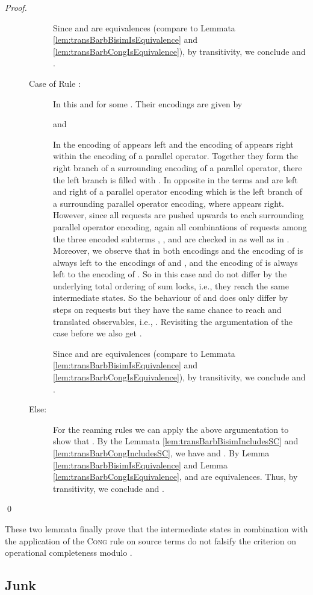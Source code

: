 \documentclass[]{llncs}
\begin{document}
\begin{proof}
\begin{description}
\begin{description}
				Since  and  are equivalences (compare to Lemmata \ref{lem:transBarbBisimIsEquivalence} and \ref{lem:transBarbCongIsEquivalence}), by transitivity, we conclude  and .
			\item[Case of Rule :] In this  and  for some . Their encodings are given by
				
				and
				
				In  the encoding of  appears left and the encoding of  appears right within the encoding of a parallel operator. Together they form the right branch of a surrounding encoding of a parallel operator, there the left branch is filled with . In opposite in  the terms  and  are left and right of a parallel operator encoding which is the left branch of a surrounding parallel operator encoding, where  appears right. However, since all requests are pushed upwards to each surrounding parallel operator encoding, again all combinations of requests among the three encoded subterms , , and  are checked in  as well as in . Moreover, we observe that in both encodings  and  the encoding of  is always left to the encodings of  and , and the encoding of  is always left to the encoding of . So in this case  and  do not differ by the underlying total ordering of sum locks, i.e., they reach the same intermediate states. So the behaviour of  and  does only differ by \pure \admin steps on requests but they have the same chance to reach  and translated observables, i.e., . Revisiting the argumentation of the case before we also get .
				
				Since  and  are equivalences (compare to Lemmata \ref{lem:transBarbBisimIsEquivalence} and \ref{lem:transBarbCongIsEquivalence}), by transitivity, we conclude  and .
			\item[Else:] For the reaming rules we can apply the above argumentation to show that . By the Lemmata \ref{lem:transBarbBisimIncludesSC} and \ref{lem:transBarbCongIncludesSC}, we have  and . By Lemma \ref{lem:transBarbBisimIsEquivalence} and Lemma \ref{lem:transBarbCongIsEquivalence},  and  are equivalences. Thus, by transitivity, we conclude  and .
		\end{description}
	\end{description}
	\qed
\end{proof}

These two lemmata finally prove that the intermediate states in combination with the application of the \textsc{Cong} rule on source terms do not falsify the criterion on operational completeness modulo .

\subsection{Junk}
\end{document}
